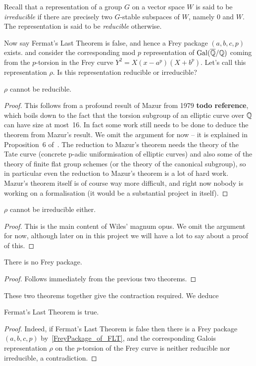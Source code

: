 Recall that a representation of a group $G$ on a vector space $W$ is said to be \emph{irreducible} if there are precisely two $G$-stable subspaces of $W$, namely $0$ and $W$. The representation is said to be \emph{reducible} otherwise.

Now say Fermat's Last Theorem is false, and hence a Frey package $(a,b,c,p)$ exists. and consider the corresponding mod $p$ representation of $\operatorname{Gal}(\overline{\mathbb{Q}}/\mathbb{Q})$ coming from the $p$-torsion in the Frey curve $Y^2=X(x-a^p)(X+b^p)$. Let's call this representation $\rho$. Is this representation reducible or irreducible?

\begin{theorem}[Mazur]\label{Mazur_on_Frey_curve} $\rho$ cannot be reducible.\end{theorem}
\begin{proof} This follows from a profound result of Mazur from 1979 {\bf todo reference}, which boils down to the fact that the torsion subgroup of an elliptic curve over $\mathbb{Q}$ can have size at most~16. In fact some work still needs to be done to deduce the theorem from Mazur's result. We omit the argument for now -- it is explained in Proposition~6 of~\cite{serreconj}. The reduction to Mazur's theorem
needs the theory of the Tate curve (concrete p-adic uniformisation of elliptic curves) and also some of the theory of finite flat group schemes (or the theory of the canonical subgroup), so in particular even the reduction to Mazur's theorem is a lot of hard work.
Mazur's theorem itself is of course way more difficult, and right now nobody is working on a formalisation (it would be a substantial
project in itself).
\end{proof}

\begin{theorem}\label{Wiles_on_Frey_curve} $\rho$ cannot be irreducible either.\end{theorem}
\begin{proof} This is the main content of Wiles' magnum opus. We omit the argument for now, although later on in this project we will have a lot to say about a proof of this.
\end{proof}

\begin{corollary} There is no Frey package.\end{corollary}\label{no_Frey_package}
\begin{proof}\tangled Follows immediately from the previous two theorems.\end{proof}

These two theorems together give the contraction required. We deduce

\begin{corollary}\label{FLT} Fermat's Last Theorem is true.\end{corollary}
\begin{proof}
Indeed, if Fermat's Last Theorem is false then there is a Frey package $(a,b,c,p)$ by~\ref{FreyPackage_of_FLT}, and the corresponding Galois representation $\rho$ on the $p$-torsion of the Frey curve is neither reducible nor irreducible, a contradiction.
\end{proof}
